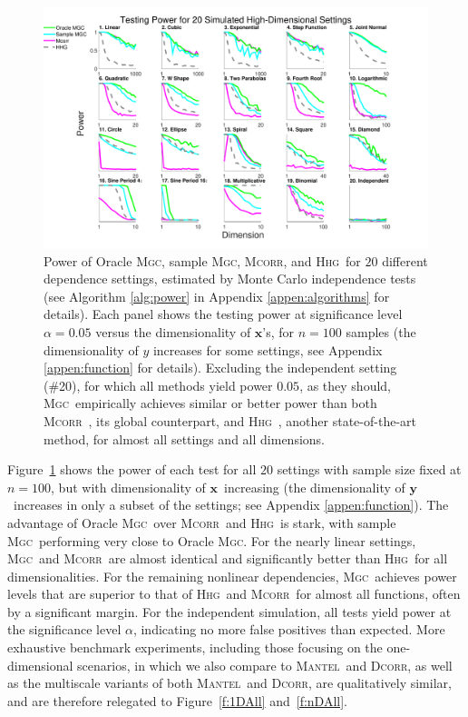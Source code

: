 \documentclass[11pt]{article}
\providecommand{\sct}[1]{{\normalfont\textsc{#1}}}
\providecommand{\mb}[1]{\boldsymbol{#1}}
\newcommand{\Mgc}{\sct{Mgc}}
\newcommand{\Hhg}{\sct{Hhg}}
\newcommand{\Dcorr}{\sct{Dcorr}}
\newcommand{\Mcorr}{\sct{Mcorr}}
\newcommand{\Mantel}{\sct{Mantel}}
\newcommand{\mbx}{\ensuremath{\mb{x}}}
\newcommand{\mby}{\ensuremath{\mb{y}}}
\begin{document}
\begin{figure}[htbp]
\includegraphics[width=1.0\textwidth]{Figures/FigHDPower}
\caption{Power of Oracle \Mgc, sample \Mgc, \Mcorr, and \Hhg~for $20$ different dependence settings, estimated by Monte Carlo independence tests (see Algorithm \ref{alg:power} in Appendix \ref{appen:algorithms} for details).  
Each panel shows the testing power at significance level $\alpha=0.05$
%
%
%
%
%
versus the dimensionality of $\mb{x}$'s, for $n=100$ samples (the dimensionality of $y$ increases for some settings, see Appendix \ref{appen:function} for details). 
Excluding the independent  setting (\#20), for which all methods yield power $0.05$, as they should, \Mgc~empirically achieves similar or better power than both \Mcorr~\cite{SzekelyRizzo2013a}, its global counterpart, and \Hhg~\cite{HellerGorfine2013}, another state-of-the-art method, for almost all settings and all dimensions. 
}
\label{f:nD}
\end{figure}

Figure~\ref{f:nD} shows  the power of each test for all $20$ settings with sample size fixed at $n=100$, but with dimensionality of \mbx~increasing (the dimensionality of \mby~increases in only a subset of the settings; see Appendix \ref{appen:function}).  
%
The advantage of Oracle \Mgc~over \Mcorr~and \Hhg~is stark, with sample \Mgc~performing very close to Oracle \Mgc. For the nearly linear settings, \Mgc~and \Mcorr~are almost identical and significantly better than \Hhg~for all dimensionalities.  For the remaining nonlinear dependencies, \Mgc~achieves power levels that are superior to that of \Hhg~and \Mcorr~for almost all functions, often by a significant margin.  For the independent simulation, all tests yield power at the significance level $\alpha$,  indicating no more false positives than expected.
More exhaustive benchmark experiments, including those focusing on the one-dimensional scenarios,
in which we also compare to \Mantel~and \Dcorr, 
as well as the multiscale variants of both \Mantel~and \Dcorr, 
 are qualitatively similar, and are therefore relegated to Figure~\ref{f:1DAll} and~\ref{f:nDAll}.
\end{document}
